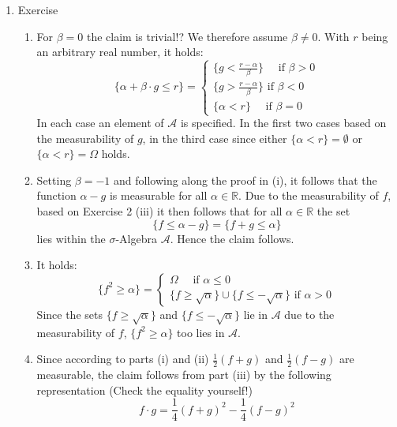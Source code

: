 \documentclass[12pt,a4paper]{article}
\begin{document}
\begin{enumerate}
\begin{enumerate}[label=(\roman*)]
\end{enumerate}

\item Exercise 

\begin{enumerate}[label=(\roman*)]

\item For $\beta = 0$  the claim is trivial!? We therefore assume $\beta \neq 0$. With $r$ being an arbitrary real number, it holds: \[
\{\alpha + \beta \cdot g \leq r\}=\begin{cases} \{g < \frac{r - \alpha}{\beta}\}\quad \text{ if } \beta > 0\\
\{g > \frac{r - \alpha}{\beta}\} \text{ if } \beta < 0\\
\{\alpha < r\} \quad\text{ if } \beta = 0 \end{cases}
\]
In each case an element of $\mathscr{A}$ is specified. In the first two cases based on the measurability of $g$, in the third case since either $\{\alpha < r\} = \emptyset $ or $\{\alpha < r\} = \Omega $ holds.

\item Setting $\beta = -1$ and following along the proof in (i), it follows that the function $\alpha - g$ is measurable for all $\alpha \in \mathbb{R}$. Due to the measurability of $f$, based on Exercise 2 (iii) it then follows that for all $\alpha \in \mathbb{R}$  the set\[
\{f \leq \alpha - g\} = \{f + g \leq \alpha\}
\]
lies within the $\sigma$-Algebra $\mathscr{A}$. Hence the claim follows.

\item It holds: \[
\{f^2 \geq \alpha\}=\begin{cases} \Omega \quad \text{ if } \alpha \leq 0\\
\{f \geq \sqrt{\alpha}\} \cup \{f \leq - \sqrt{\alpha}\} \text{ if } \alpha > 0 \end{cases}
\]
Since the sets $\{f \geq \sqrt{\alpha}\}$ and $\{f \leq - \sqrt{\alpha}\}$ lie in $\mathscr{A}$ due to the measurability of $f$, $\{f^2 \geq \alpha\}$ too lies in $\mathscr{A}$.

\item Since according to parts (i) and (ii)  $\frac{1}{2}(f + g)$ and $\frac{1}{2}(f - g)$ are measurable, the claim follows from part (iii) by the following representation (Check the equality yourself!) \[
f \cdot g = \frac{1}{4}(f + g)^2 - \frac{1}{4}(f - g)^2
\]

\end{enumerate}


\end{enumerate}
\end{document}
